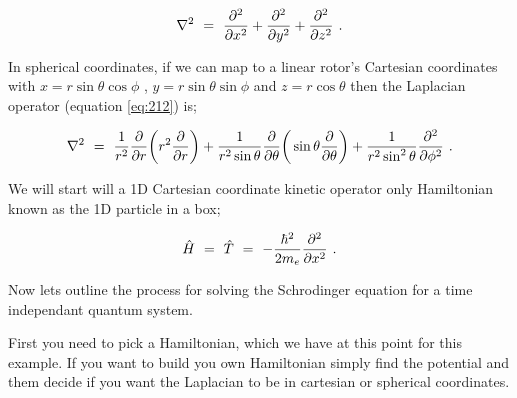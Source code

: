 \documentclass{article}
\begin{document}
\begin{equation} \label{eq:212}
\nabla^2 \hspace{0.125cm} = \hspace{0.125cm} \frac{\partial^{2}}{\partial{x^{2}}} + \frac{\partial^{2}}{\partial{y^{2}}} +
\frac{\partial^{2}}{\partial{z^{2}}} \hspace{0.125cm} .
\end{equation}

In spherical coordinates, if we can map to a linear rotor's Cartesian coordinates with \begin{math} x = r\sin{\theta}\cos{\phi} \end{math} , \begin{math} y = r\sin{\theta}\sin{\phi} \end{math} and \begin{math} z = r\cos{\theta} \end{math} then the Laplacian operator (equation \ref{eq:212}) is;

\begin{equation} \label{eq:213}
\nabla^2 \hspace{0.125cm} = \hspace{0.125cm} \frac{1}{r^2}\frac{\partial{}}{\partial{r}}\bigg(r^2\frac{\partial{}}{\partial{r}}\bigg) + \frac{1}{r^2\sin{\theta{}}}\frac{\partial{}}{\partial{\theta{}}}\bigg(\sin{\theta}\frac{\partial{}}{\partial{\theta{}}}\bigg) + \frac{1}{r^2\sin^2{\theta{}}}\frac{\partial^{2}}{\partial{\phi^2}} \hspace{0.125cm} .
\end{equation}

We will start will a 1D Cartesian coordinate kinetic operator only Hamiltonian known as the 1D particle in a box;

\begin{equation} \label{eq:214}
\hat{H} \hspace{0.125cm} = \hspace{0.125cm} \hat{T} \hspace{0.125cm} = \hspace{0.125cm} -\frac{\hbar^2}{2m_e}\frac{\partial^2}{\partial{x^2}} \hspace{0.125cm} .
\end{equation} 

Now lets outline the process for solving the Schrodinger equation for a time independant quantum system. 

First you need to pick a Hamiltonian, which we have at this point for this example. If you want to build you own Hamiltonian simply find the potential and them decide if you want the Laplacian to be in cartesian or spherical coordinates.
\end{document}
